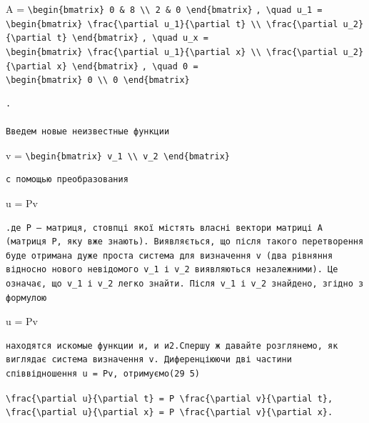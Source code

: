 \documentclass[
  ukrainian,
]{article}
\begin{document}
A =
\texttt{\textbackslash{}begin\{bmatrix\}\ 0\ \&\ 8\ \textbackslash{}\textbackslash{}\ 2\ \&\ 0\ \textbackslash{}end\{bmatrix\}}
\texttt{,\ \textbackslash{}quad\ u\_1\ =}
\texttt{\textbackslash{}begin\{bmatrix\}\ \textbackslash{}frac\{\textbackslash{}partial\ u\_1\}\{\textbackslash{}partial\ t\}\ \textbackslash{}\textbackslash{}\ \textbackslash{}frac\{\textbackslash{}partial\ u\_2\}\{\textbackslash{}partial\ t\}\ \textbackslash{}end\{bmatrix\}}
\texttt{,\ \textbackslash{}quad\ u\_x\ =}
\texttt{\textbackslash{}begin\{bmatrix\}\ \textbackslash{}frac\{\textbackslash{}partial\ u\_1\}\{\textbackslash{}partial\ x\}\ \textbackslash{}\textbackslash{}\ \textbackslash{}frac\{\textbackslash{}partial\ u\_2\}\{\textbackslash{}partial\ x\}\ \textbackslash{}end\{bmatrix\}}
\texttt{,\ \textbackslash{}quad\ 0\ =}
\texttt{\textbackslash{}begin\{bmatrix\}\ 0\ \textbackslash{}\textbackslash{}\ 0\ \textbackslash{}end\{bmatrix\}}

\begin{verbatim}
.

Введем новые неизвестные функции
\end{verbatim}

v =
\texttt{\textbackslash{}begin\{bmatrix\}\ v\_1\ \textbackslash{}\textbackslash{}\ v\_2\ \textbackslash{}end\{bmatrix\}}

\begin{verbatim}
с помощью преобразования
\end{verbatim}

u = Pv

\begin{verbatim}
.де P — матриця, стовпці якої містять власні вектори матриці A (матриця P, яку вже знають). Виявляється, що після такого перетворення буде отримана дуже проста система для визначення v (два рівняння відносно нового невідомого v_1 і v_2 виявляються незалежними). Це означає, що v_1 і v_2 легко знайти. Після v_1 і v_2 знайдено, згідно з формулою
\end{verbatim}

u = Pv

\begin{verbatim}
находятся искомые функции и, и и2.Спершу ж давайте розглянемо, як виглядає система визначення v. Диференціюючи дві частини співвідношення u = Pv, отримуємо(29 5)
\end{verbatim}

\texttt{\textbackslash{}frac\{\textbackslash{}partial\ u\}\{\textbackslash{}partial\ t\}\ =\ P\ \textbackslash{}frac\{\textbackslash{}partial\ v\}\{\textbackslash{}partial\ t\},}
\texttt{\textbackslash{}frac\{\textbackslash{}partial\ u\}\{\textbackslash{}partial\ x\}\ =\ P\ \textbackslash{}frac\{\textbackslash{}partial\ v\}\{\textbackslash{}partial\ x\}.}
\end{document}
